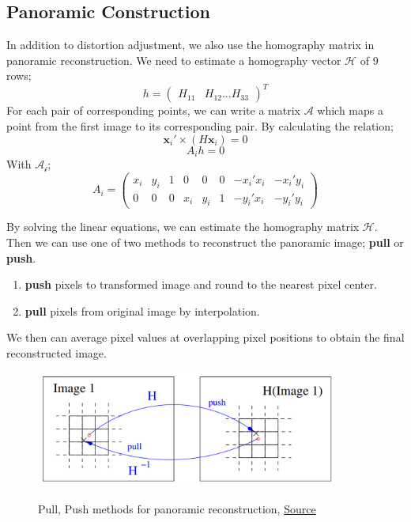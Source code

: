 \documentclass{article}
\begin{document}
\subsection{Panoramic Construction}
In addition to distortion adjustment, we also use the homography matrix in panoramic reconstruction. We need to estimate a homography vector $\mathcal{H}$ of 9 rows; \begin{equation}
    h = \begin{pmatrix}
    H_{11} & H_{12} ... H_{33}
    \end{pmatrix}^T
\end{equation}
For each pair of corresponding points, we can write a matrix $\mathcal{A}$ which maps a point from the first image to its corresponding pair. By calculating the relation; \begin{equation}
    \textbf{x}_{i}' \times (H\textbf{x}_{i}) = 0
\end{equation}
\begin{equation}
    A_ih = 0
\end{equation}
With $\mathcal{A_i}$; 
\begin{equation}
    A_i = \begin{pmatrix}
    x_i & y_i & 1 & 0 & 0 & 0 & -x_i'x_i & -x_i'y_i \\
    0 & 0 & 0 & x_i & y_i & 1 & -y_i'x_i & -y_i'y_i
    \end{pmatrix}
\end{equation}

By solving the linear equations, we can estimate the homography matrix $\mathcal{H}$. Then we can use one of two methods to reconstruct the panoramic image; \textbf{pull} or \textbf{push}.
\begin{enumerate}
    \item \textbf{push} pixels to transformed image and round to the nearest pixel center. 
    \item \textbf{pull} pixels from original image by interpolation.
\end{enumerate}
We then can average pixel values at overlapping pixel positions to obtain the final reconstructed image.
\begin{figure}%
    \centering
    {\includegraphics[width=10cm]{pull_push.png}}%
    \caption{Pull, Push methods for panoramic reconstruction, \href{http://imagine.enpc.fr/~monasse/Stereo/}{Source}}%
    \label{fig:example}%
\end{figure}
\end{document}

